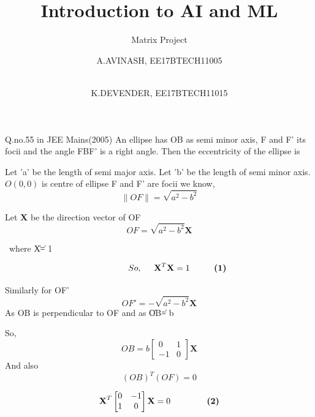 \documentclass{beamer}
\title{Introduction to AI and ML}
\subtitle{ Matrix Project}
\author{A.AVINASH, EE17BTECH11005 \and \\K.DEVENDER, EE17BTECH11015}
\begin{document}
\begin{frame}

\titlepage
 
\end{frame}  

\begin{frame}[t]{Q.no.55 in JEE Mains(2005)}
An ellipse has OB as semi minor axis, F and F' its focii and the angle FBF' is a right angle. Then the eccentricity of the ellipse is
\end{frame}
\begin{frame}
Let 'a' be the length of semi major axis.
\newline
Let 'b' be the length of semi minor axis.
\newline
$O(0,0)$ is centre of ellipse
\newline
\Let F and F' are focii
\newline
we know, 
\newline
\[\| OF\| = \sqrt{a^{2}-b^{2}}\]
\newline



\end{frame}
\begin{frame}
Let \textbf{X} be the direction vector of OF 
\newline
\[OF = \sqrt{a^{2}-b^{2}}\textbf{X}\]
 
\ \hspace{30mm}where \|X\| = 1



\[ \hspace{15mm} So,\hspace{5mm} \textbf{X}^{T}\textbf{X} = 1 \hspace{10mm}\textbf{(1)} \]

\newline
Similarly for OF'
\newline
\[OF' = -\sqrt{a^{2}-b^{2}}\textbf{X}\]
As OB is perpendicular to OF and as \|OB\| = b

\end{frame}
\begin{frame}
So,
\newline
\[OB = b\begin{bmatrix}
0 & 1 \\
-1 & 0
\end{bmatrix}\textbf{X}\]
\newline
And also
\newline
\[(OB)^{T}(OF) = 0\] 

\newline
\[\textbf{X}^{T}\begin{bmatrix}
0 & -1 \\
1 & 0
\end{bmatrix}\textbf{X} = 0 \hspace{15mm}\textbf{(2)} \]
\end{frame}
\end{document}
